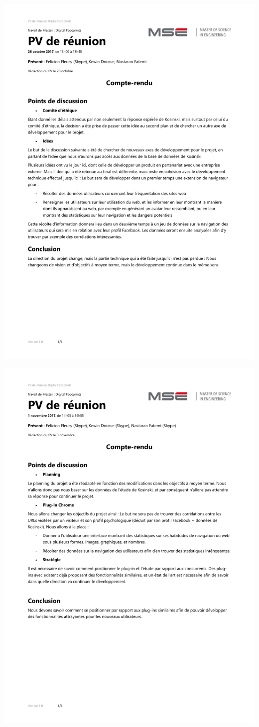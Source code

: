\includegraphics[width=1\textwidth]{images/annexes/pvs/DigFootprints_PV_26_10_2017}

\includegraphics[width=1\textwidth]{images/annexes/pvs/DigFootprints_PV_01_11_2017}